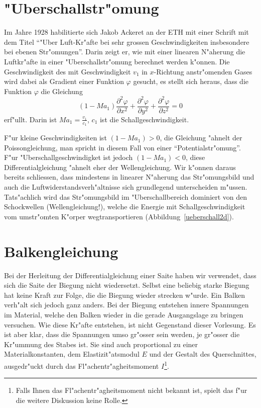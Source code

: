 \section{"Uberschallstr"omung \label{beispiele:ueberschall}}
Im Jahre 1928 habilitierte sich Jakob Ackeret an der ETH mit einer
Schrift mit dem Titel ``"Uber Luft-Kr"afte bei sehr grossen
Geschwindigkeiten insbesondere bei ebenen Str"omungen''. Darin
zeigt er, wie mit einer linearen N"aherung die Luftkr"afte
in einer "Uberschallstr"omung berechnet werden k"onnen.
Die Geschwindigkeit des mit Geschwindigkeit $v_1$ in $x$-Richtung
anstr"omenden
Gases wird dabei als Gradient einer Funktion $\varphi$ gesucht,
es stellt sich heraus, dass die Funktion $\varphi$ die Gleichung
\[
(1-Ma_1)\frac{\partial^2\varphi}{\partial x^2}
+
\frac{\partial^2\varphi}{\partial y^2}
+
\frac{\partial^2\varphi}{\partial z^2}=0
\]
erf"ullt.
Darin ist $Ma_1=\frac{v_1}{c_1}$, $c_1$ ist die Schallgeschwindigkeit.

F"ur kleine Geschwindigkeiten ist $(1-Ma_1)>0$, die Gleichung "ahnelt
der Poissongleichung, man spricht in diesem Fall von einer
``Potentialstr"omung''.
F"ur "Uberschallgeschwindigket ist jedoch $(1-Ma_1) < 0$,
diese Differentialgleichung "ahnelt eher der Wellengleichung.
Wir k"onnen daraus bereits schliessen, dass mindestens in linearer
N"aherung das Str"omungsbild und auch die Luftwiderstandsverh"altnisse
sich grundlegend unterscheiden m"ussen.
Tats"achlich wird das Str"omungsbild im "Uberschallbereich dominiert
von den Schockwellen (Wellengleichung!), welche die Energie mit
Schallgeschwindigkeit vom umstr"omten K"orper wegtransportieren
(Abbildung~\ref{ueberschall2d}).

\section{Balkengleichung\label{beispiele:balkengleichung}}
Bei der Herleitung der Differentialgleichung einer Saite haben
wir verwendet, dass sich die Saite der Biegung nicht wiedersetzt.
Selbst eine beliebig starke Biegung hat keine Kraft zur Folge, die
die Biegung wieder strecken w"urde.
Ein Balken verh"alt sich jedoch ganz anders. Bei der Biegung entstehen
innere Spannungen im Material, welche den Balken wieder in die
gerade Ausgangslage zu bringen versuchen.
Wie diese Kr"afte entstehen, ist nicht Gegenstand dieser Vorlesung.
Es ist aber klar, dass die Spannungen umso gr"osser sein werden,
je gr"osser die Kr"ummung des Stabes ist. Sie sind auch proportional
zu einer Materialkonstanten, dem Elastizit"atsmodul $E$ und der
Gestalt des Querschnittes, ausgedr"uckt durch das Fl"achentr"agheitsmoment
$I$\footnote{Falls Ihnen das Fl"achentr"agheitsmoment nicht bekannt ist,
spielt das f"ur die weitere Diskussion keine Rolle.}.

